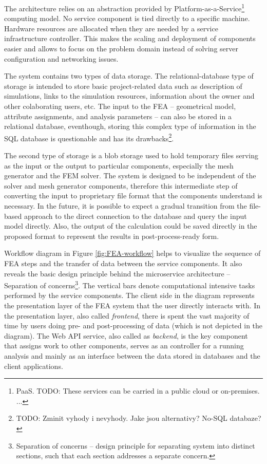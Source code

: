 The architecture relies on an abstraction provided by Platform-as-a-Service\footnote{PaaS. TODO: These services can be carried in a public cloud or on-premises. ...} computing model. No service component is tied directly to a specific machine. Hardware resources are allocated when they are needed by a service infrastructure controller. This makes the scaling and deployment of components easier and allows to focus on the problem domain instead of solving server configuration and networking issues.

The system contains two types of data storage. The relational-database type of storage is intended to store basic project-related data such as description of simulations, links to the simulation resources, information about the owner and other colaborating users, etc. The input to the FEA -- geometrical model, attribute assignments, and analysis parameters -- can also be stored in a relational database, eventhough, storing this complex type of information in the SQL database is questionable and has its drawbacks\footnote{TODO: Zminit vyhody i nevyhody. Jake jsou alternativy? No-SQL databaze?}.

The second type of storage is a blob storage used to hold temporary files serving as the input or the output to particular components, especially the mesh generator and the FEM solver. The system is designed to be independent of the solver and mesh generator components, therefore this intermediate step of converting the input to proprietary file format that the components understand is necessary. In the future, it is possible to expect a gradual transition from the file-based approach to the direct connection to the database and query the input model directly. Also, the output of the calculation could be saved directly in the proposed format to represent the results in post-process-ready form.

Workflow diagram in Figure \ref{fig:FEA-workflow} helps to visualize the sequence of FEA steps and the transfer of data between the service components. It also reveals the basic design principle behind the microservice architecture -- Separation of concerns\footnote{Separation of concerns -- design principle for separating system into distinct sections, such that each section addresses a separate concern.}. The vertical bars denote computational intensive tasks performed by the service components. The client side in the diagram represents the presentation layer of the FEA system that the user directly interacts with. In the presentation layer, also called \textit{frontend}, there is spent the vast majority of time by users doing pre- and post-processing of data (which is not depicted in the diagram). The Web API service, also called as \textit{backend}, is the key component that assigns work to other components, serves as an controller for a running analysis and mainly as an interface between the data stored in databases and the client applications.

